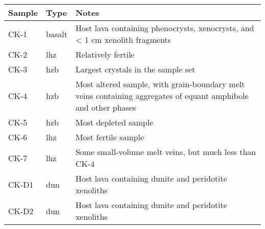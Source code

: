 \begin{tabularx}{\textwidth}{l l X}
\toprule
  Sample & Type & Notes \\
\midrule
  CK-1 & basalt & Host lava containing phenocrysts, xenocrysts, and < 1 cm xenolith fragments \\
  CK-2 & lhz & Relatively fertile \\
  CK-3 & hzb & Largest crystals in the sample set \\
  CK-4 & hzb & Most altered sample, with grain-boundary melt veins containing aggregates of equant amphibole and other phases \\
  CK-5 & hzb & Most depleted sample \\
  CK-6 & lhz & Most fertile sample \\
  CK-7 & lhz & Some small-volume melt veins, but much less than CK-4 \\
  CK-D1 & dun & Host lava containing dunite and peridotite xenoliths \\
  CK-D2 & dun & Host lava containing dunite and peridotite xenoliths \\
\bottomrule
\end{tabularx}
